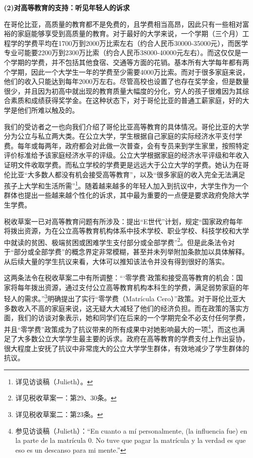 \documentclass{phyasgn}\usepackage{nag}
\begin{document}
\par \textbf{(2)对高等教育的支持：听见年轻人的诉求}
\par 在哥伦比亚，高质量的教育都不是免费的，且学费相当高昂，因此只有一些相对富裕的家庭能够享受到高质量的教育。对于最好的大学来说，一个学期（三个月）工程学的学费平均在1700万到2000万比索左右（约合人民币30000-35000元），而医学专业可能要2200万到2300万比索（约合人民币38000-40000元左右）。而这仅仅是一个学期的学费，并不包括其他食宿、交通等方面的花销。基本所有大学每年都有两个学期，因此一个大学生一年的学费至少需要4000万比索。而对于很多家庭来说，他们的收入只能达到每年2000万左右。尽管高校也设置了也存在奖学金，但是数量很少，并且因为初高中就出现的教育质量大幅度的分化，穷人的孩子很难因为其综合素质和成绩获得奖学金。在这种状态下，对于哥伦比亚的普通工薪家庭，好的大学是他们所难以触及的。
\par 我们的受访者之一也向我们介绍了哥伦比亚高等教育的具体情况。哥伦比亚的大学分为公立与私立两大类。在公立大学，学生根据自己家庭的实际经济水平支付学费。每年或每两年，政府都会对此做一次普查，会有专员来到学生家里，按照特定评价标准给予该家庭经济水平的评级。公立大学根据家庭的经济水平评级和年收入证明文件收取学费。而私立学校的学费更是远远大于公立大学的学费。她认为在哥伦比亚“大多数人都没有机会接受高等教育”，以及“很多家庭的收入完全无法满足孩子上大学和生活所需”\footnote[33]{详见访谈稿（Julieth）。}。随着越来越多的年轻人加入到抗议中，大学生作为一个群体也提出一些越来越个性化的诉求，其中最为重要的一点便是要求政府免除大学生学费。
\par 税收草案一已对高等教育问题有所涉及：提出“E世代”计划，规定“国家政府每年将拨出资源，为在公立高等教育机构体系中技术学校、职业学校、科技学校和大学中就读的贫困、极端贫困或困难学生支付部分或全部学费”\footnote[34]{详见税收草案一：第29、30条。}。但是此条法令对于“部分或全部学费”的概念界定非常模糊，甚至并未列举附加条款加以具体解释。从后续大量的学生抗议来看，大体可以推知该法令并没有得到很好的落实。
\par 这两条法令在税收草案二中有所调整：“‘零学费’政策和接受高等教育的机会：国家将每年拨出资源，通过支付公立高等教育机构本科生的学费，满足弱势家庭的年轻人的需求。”\footnote[35]{详见税收草案二：第23条。}明确提出了实行“零学费（Matrícula Cero）”政策。对于哥伦比亚大多数收入不高的家庭来说，这无疑大大减轻了他们的经济负担。而在政策的落实方面，我们的访谈对象表示，她和同学们在后来的一个学期完全不必支付任何学费，并且“零学费”政策成为了抗议带来的所有成果中对她影响最大的一项\footnote[36]{参见访谈稿（Julieth）：“En cuanto a mí personalmente, (la influencia fue) en la parte de la matrícula 0. No tuve que pagar la matrícula y la verdad es que eso es un descanso para mi mente.”}，而这也满足了大多数公立大学学生最主要的诉求。政府在高等教育的学费支付上作出妥协，很大程度上安抚了抗议中非常庞大的公立大学学生群体，有效地减少了学生群体的抗议。
\end{document}
